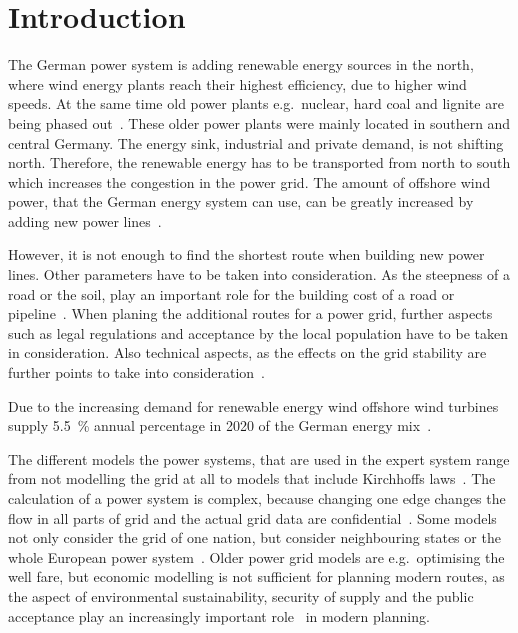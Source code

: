 \documentclass[acmtog]{acmart}
\begin{document}
	\section{Introduction}\label{sec:introduction}

	The German power system is adding renewable energy sources in the north, where wind energy plants reach their highest efficiency, due to higher wind speeds.
	At the same time old power plants e.g.\ nuclear, hard coal and lignite are being phased out~\cite{eser-frey_analyzing_2012}.
	These older power plants were mainly located in southern and central Germany. 
	The energy sink,  industrial and private demand, is not shifting north.
	Therefore, the renewable energy has to be transported from north to south which increases the congestion in the power grid. 
	The amount of offshore wind power, that the German energy system can use, can be greatly increased by adding new power lines~\cite{leuthold_nodal_2005}.
	
	However, it is not enough to find the shortest route when building new power lines.
	Other parameters have to be taken into consideration.
	As the steepness of a road or the soil, play an important role for the building cost of a road or pipeline~\cite{suleiman_optimal_2015}.
	When planing the additional routes for a power grid, further aspects such as legal regulations and acceptance
	by the local population have to be taken in consideration.
	Also technical aspects, as the effects on the grid stability are further points to take into consideration~\cite{schafer_understanding_2022}.
	
	Due to the increasing demand for renewable energy wind offshore wind turbines supply 5.5~\% annual percentage in 2020 of the German energy mix~\cite{noauthor_nettostromerzeugung_2021}.

	The different models the power systems, that are used in the expert system range from not modelling the grid at all to models that include Kirchhoffs laws~\cite{bertsch_participatory_2016}.
	The calculation of a power system is complex, because changing one edge changes the flow in all parts of grid and the actual grid data are confidential~\cite{bertsch_participatory_2016}.
	Some models not only consider the grid of one nation, but consider neighbouring states or the whole European power system~\cite{dietrich_will_2010}.	
	Older power grid models are e.g.\ optimising the well fare, but economic modelling is not sufficient for planning modern routes, as the aspect of environmental sustainability, security of supply and the public acceptance play an increasingly important role~\cite{hauff_gesellschaftliche_2011} in modern planning.
	
\end{document}
